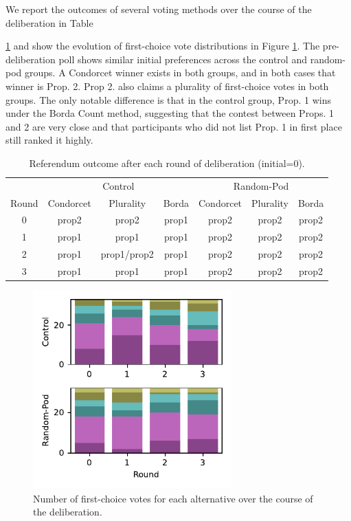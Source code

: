 We report the outcomes of several voting methods over the course of the deliberation in Table {\ref{tab:outcome} and show the evolution of first-choice vote distributions in Figure \ref{fig:firstplace}.
The pre-deliberation poll shows similar initial preferences across the control and random-pod groups.
A Condorcet winner exists in both groups, and in both cases that winner is Prop. 2.
Prop 2. also claims a plurality of first-choice votes in both groups.
The only notable difference is that in the control group, Prop. 1 wins under the Borda Count method, suggesting that the contest between Props. 1 and 2 are very close and that participants who did not list Prop. 1 in first place still ranked it highly.

\begin{table}[]
    \centering
    \begin{tabular}{c c c c c c c}
\hline
& \multicolumn{3}{c}{Control} & \multicolumn{3}{c}{Random-Pod} \\
\cmidrule(r){1-1}
\cmidrule(lr){2-4}
\cmidrule(l){5-7}
Round & Condorcet & Plurality & Borda &
Condorcet & Plurality & Borda \\
\cmidrule(r){1-1}
\cmidrule(lr){2-4}
\cmidrule(l){5-7}

0 & prop2 & prop2 & prop1 & 
prop2 & prop2 & prop2 \\

1 & prop1 & prop1 & prop1 &
prop2 & prop2 & prop2 \\

2 & prop1 & prop1/prop2 & prop1 &
prop2 & prop2 & prop2 \\

3 & prop1 & prop1 & prop1 &
prop2 & prop2 & prop2 \\
\hline
    \end{tabular}
    \caption{Referendum outcome after each round of deliberation (initial=0).}
    \label{tab:outcome}
\end{table}

\begin{figure}
    \centering
    \includegraphics[width=3in]{chapters/figures/NetDelibExp/fig-counts.pdf}
    \caption{Number of first-choice votes for each alternative over the course of the deliberation.}
    \label{fig:firstplace}
\end{figure}

}
